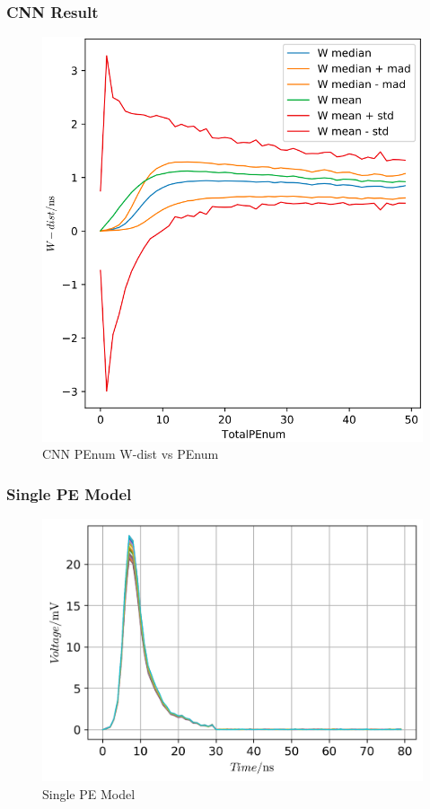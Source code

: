 \documentclass{beamer}
\begin{document}
\begin{frame}
\frametitle{CNN Result}
\setlength{\abovecaptionskip}{0mm}
\setlength{\belowcaptionskip}{0mm}
\begin{figure}
    \centering
    \caption{CNN PEnum W-dist vs PEnum}
    \includegraphics[width=0.65\linewidth]{img/takarapenumstats.png}
\end{figure}
\end{frame}

\begin{frame}
\frametitle{Single PE Model}
\begin{figure}
    \centering
    \caption{Single PE Model}
    \includegraphics[width=0.9\linewidth]{img/spe.png}
\end{figure}
\end{frame}
\end{document}
